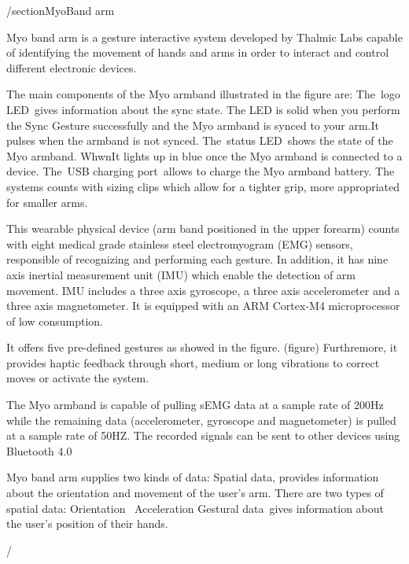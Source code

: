 /section{MyoBand arm}

Myo band arm is a gesture interactive system developed by Thalmic Labs capable of identifying the movement of hands and arms in order to interact and control different electronic devices.


The main components of the Myo armband illustrated in the figure %
are:
The logo LED gives information about the sync state. The LED is solid when you perform the Sync Gesture successfully and the Myo armband is synced to your arm.It pulses when the armband is not synced. 
The status LED shows the state of the Myo armband. WhwnIt lights up in blue once the Myo armband is connected to a device.
The USB charging port allows to charge the Myo armband battery. 
The systems counts with sizing clips which allow for a tighter grip, more appropriated for smaller arms.

This wearable physical device (arm band positioned in the upper forearm) counts with eight medical grade stainless steel electromyogram (EMG) sensors, responsible of recognizing and performing each gesture. In addition, it has nine axis inertial measurement unit (IMU) which enable the detection of arm movement. IMU includes a three axis gyroscope,  a three axis accelerometer and a three axis magnetometer. It is equipped with an ARM Cortex-M4 microprocessor of low consumption.

It offers five pre-defined gestures as showed in the figure. (figure) Furthremore, it provides haptic feedback through short, medium or long vibrations to correct moves or activate the system.

The Myo armband is capable of pulling sEMG data at a sample rate of 200Hz while the remaining data (accelerometer, gyroscope and magnetometer) is pulled at a sample rate of  50HZ. The recorded signals can be sent to other devices using Bluetooth 4.0 

Myo band arm supplies two kinds of data:
Spatial data, provides information about the orientation and movement of the user's arm. There are two types of spatial data:
Orientation  
Acceleration 
Gestural data gives information about the user’s position of their hands. 









/